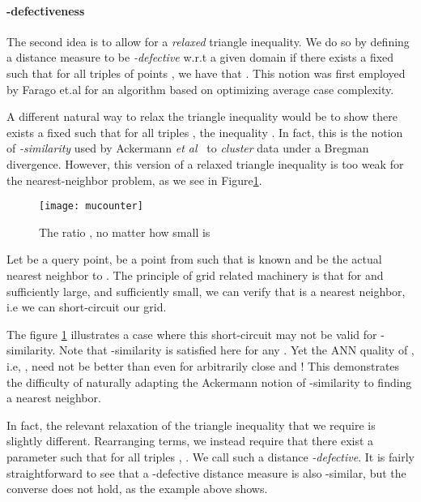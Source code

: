 \documentclass[11pt]{myclass}
\newcommand{\etal}{\emph{et al}\xspace}
\begin{document}
\paragraph{-defectiveness}

The second idea is to allow for a \emph{relaxed} triangle inequality. We do so by defining a distance measure to be 
\emph{-defective} w.r.t a given domain if there exists a fixed  such that for all triples of points  , we have that
. This notion was first employed by Farago et.al \cite{firstdefect} for an algorithm based on optimizing average case
complexity. 

A different natural way to relax the triangle inequality would be to show there exists a fixed  such that 
for all triples , the inequality . In fact, this is the notion of \emph{-similarity} used by 
Ackermann \etal~\cite{musimilarcoresets}  to \emph{cluster} data under a Bregman divergence. However, this version of a relaxed triangle inequality 
is too weak for the nearest-neighbor problem, as we see in Figure\ref{counter}. 

\begin{figure}[H]
  \begin{center}
    \texttt{[image: mucounter]}
  \end{center}
  \caption{The ratio , no matter how small  is}
  \label{counter}
\end{figure}

Let  be a query point,  be a point from  such that  is known and  
be the actual nearest neighbor to . The principle of grid related machinery is that for  and  sufficiently 
large, and  sufficiently small, we can verify that  is a  nearest neighbor, 
i.e we can short-circuit our grid. 

The figure \ref{counter} illustrates a case where this short-circuit may not be valid for -similarity. Note that -similarity is satisfied 
here for any . Yet the ANN quality of , i.e, , need not be better than  even 
for arbitrarily close  and ! This demonstrates the difficulty of naturally 
adapting the Ackermann notion of -similarity to finding a  nearest neighbor.

In fact, the relevant relaxation of the triangle inequality that we require is slightly different. Rearranging terms, we instead require that there exist 
a parameter  such that for all triples , . We call such a distance \emph{-defective}. 
It is fairly straightforward to see that a -defective distance measure is also -similar, but the converse does not hold, 
as the example above shows.
\end{document}
